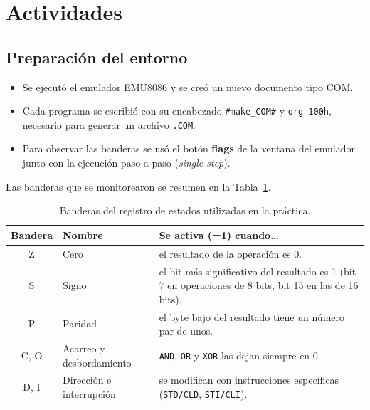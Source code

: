 \documentclass[10pt]{article}
\begin{document}
\section{Actividades}
 
\subsection{Preparación del entorno}
 
\begin{itemize}
  \item Se ejecutó el emulador EMU8086 y se creó un nuevo documento tipo COM.
  \item Cada programa se escribió con su encabezado \texttt{\#make\_COM\#} y \texttt{org 100h}, necesario para generar un archivo \texttt{.COM}.
  \item Para observar las banderas se usó el botón \textbf{flags} de la ventana del emulador junto con la ejecución paso a paso (\textit{single step}).
\end{itemize}
 
Las banderas que se monitorearon se resumen en la Tabla~\ref{tab:banderas}.
 
\begin{table}[htbp]
  \centering
  \caption{Banderas del registro de estados utilizadas en la práctica.}
  \label{tab:banderas}
  \begin{tabular}{|c|p{3cm}|p{5.5cm}|}
    \hline
    \textbf{Bandera} & \textbf{Nombre} & \textbf{Se activa (=1) cuando\ldots} \\
    \hline
    Z & Cero & el resultado de la operación es 0. \\
    \hline
    S & Signo & el bit más significativo del resultado es 1 (bit 7 en operaciones de 8 bits, bit 15 en las de 16 bits). \\
    \hline
    P & Paridad & el byte bajo del resultado tiene un número par de unos. \\
    \hline
    C, O & Acarreo y desbordamiento & \texttt{AND}, \texttt{OR} y \texttt{XOR} las dejan siempre en 0. \\
    \hline
    D, I & Dirección e interrupción & se modifican con instrucciones específicas (\texttt{STD/CLD}, \texttt{STI/CLI}). \\
    \hline
  \end{tabular}
\end{table}
 
\end{document}
